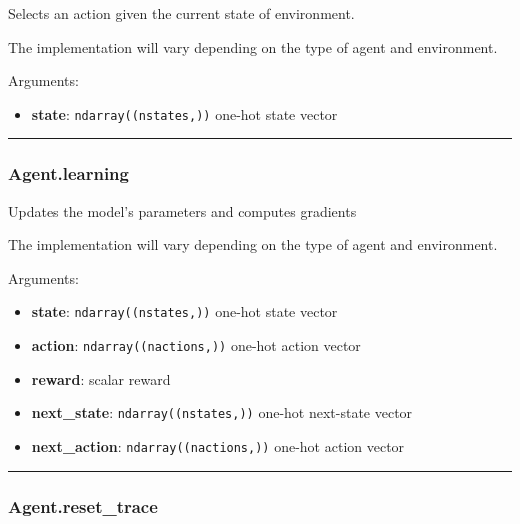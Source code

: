 Selects an action given the current state of environment.

The implementation will vary depending on the type of agent and
environment.

Arguments:

\begin{itemize}
\tightlist
\item
  \textbf{state}: \texttt{ndarray((nstates,))} one-hot state vector
\end{itemize}

\begin{center}\rule{0.5\linewidth}{\linethickness}\end{center}

\subsubsection{Agent.learning}\label{agent.learning}

\begin{Shaded}
\begin{Highlighting}[]
\end{Highlighting}
\end{Shaded}

Updates the model's parameters and computes gradients

The implementation will vary depending on the type of agent and
environment.

Arguments:

\begin{itemize}
\tightlist
\item
  \textbf{state}: \texttt{ndarray((nstates,))} one-hot state vector
\item
  \textbf{action}: \texttt{ndarray((nactions,))} one-hot action vector
\item
  \textbf{reward}: scalar reward
\item
  \textbf{next\_state}: \texttt{ndarray((nstates,))} one-hot next-state
  vector
\item
  \textbf{next\_action}: \texttt{ndarray((nactions,))} one-hot action
  vector
\end{itemize}

\begin{center}\rule{0.5\linewidth}{\linethickness}\end{center}

\subsubsection{Agent.reset\_trace}\label{agent.reset_trace}

